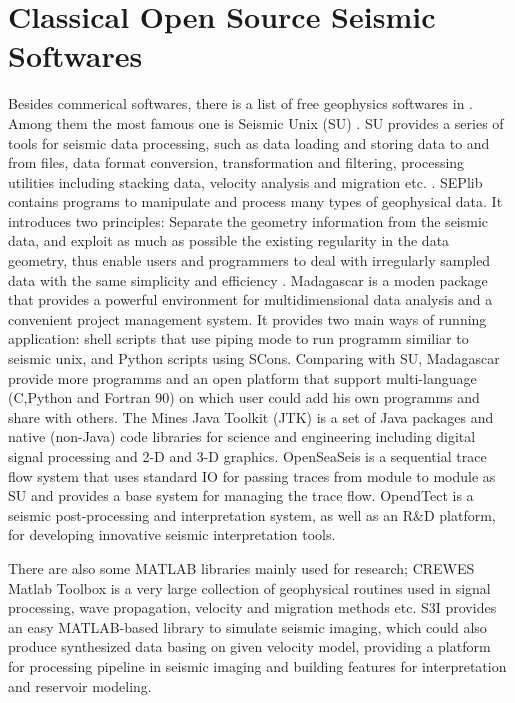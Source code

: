 \section{Classical Open Source Seismic Softwares}
Besides commerical softwares, there is a list of free geophysics softwares in \cite{listofgeosw}. Among them the most famous one is Seismic Unix (SU) \cite{SUHome}. SU provides a series of tools for seismic data processing, such as data loading and storing data to and from files, data format conversion, transformation and filtering, processing utilities including stacking data, velocity analysis and migration etc. \cite{SUManual}. SEPlib \cite{SEPlibHome} contains programs to manipulate and process many types of geophysical data. It introduces two principles: Separate the geometry information from the seismic data, and exploit as much as possible the existing regularity in the data geometry, thus enable users and programmers to deal with irregularly sampled data with the same simplicity and efficiency \cite{SEPManual}. Madagascar \cite{MadagascarHome} is a moden package that provides a powerful environment for multidimensional data analysis and a convenient project management system. It provides two main ways of running application: shell scripts that use piping mode to run programm similiar to seismic unix, and Python scripts using SCons. Comparing with SU, Madagascar provide more programms and an open platform that support multi-language (C,Python and Fortran 90) on which user could add his own programms and share with others. The Mines Java Toolkit (JTK) \cite{JTKHome} is a set of Java packages and native (non-Java) code libraries for science and engineering including digital signal processing and 2-D and 3-D graphics. OpenSeaSeis \cite{OpenSeaSeis} is a sequential trace flow system that uses standard I\/O for passing traces from module to module as SU and provides a base system for managing the trace flow. OpendTect \cite{OpendTectMainPage} is a seismic post-processing and interpretation system, as well as an R\&D platform, for developing innovative seismic interpretation tools.

There are also some MATLAB libraries mainly used for research; CREWES Matlab Toolbox \cite{CREWESMatlab} is a very large collection of geophysical routines used in signal processing, wave propagation, velocity and migration methods etc. S3I \cite{CeGPS3I} provides an easy MATLAB-based library to simulate seismic imaging, which could also produce synthesized data basing on given velocity model, providing a platform for processing pipeline in seismic imaging and building features for interpretation and reservoir modeling.  

